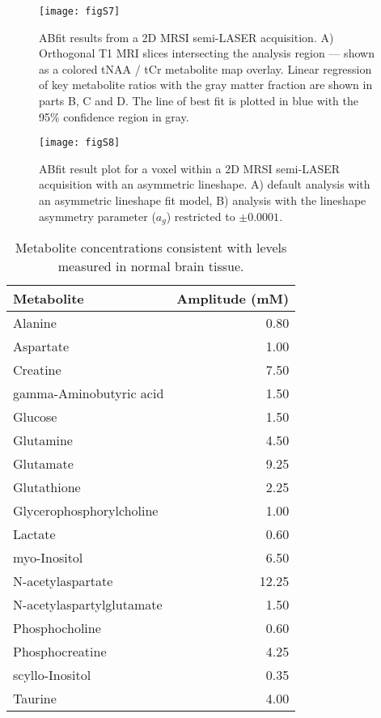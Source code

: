 \documentclass[num-refs]{wiley-article}
\begin{document}
\begin{figure}
  \begin{center}
    \texttt{[image: figS7]}
    \caption{ABfit results from a 2D MRSI semi-LASER acquisition. A) Orthogonal T1 MRI slices intersecting the analysis region --- shown as a colored tNAA / tCr metabolite map overlay. Linear regression of key metabolite ratios with the gray matter fraction are shown in parts B, C and D. The line of best fit is plotted in blue with the 95\% confidence region in gray.}
    \label{mrsi_res}
  \end{center}
\end{figure}

\begin{figure}
  \begin{center}
    \texttt{[image: figS8]}
    \caption{ABfit result plot for a voxel within a 2D MRSI semi-LASER acquisition with an asymmetric lineshape. A) default analysis with an asymmetric lineshape fit model, B) analysis with the lineshape asymmetry parameter ($a_{g}$) restricted to $\pm 0.0001$.}
    \label{lineshape_res}
  \end{center}
\end{figure}

\begin{table}[ht]
\begin{center}
\begin{tabular}{l r}
  \hline
  Metabolite & Amplitude (mM) \\
  \hline
  Alanine & 0.80 \\
  Aspartate & 1.00 \\
  Creatine & 7.50 \\
  gamma-Aminobutyric acid & 1.50 \\
  Glucose & 1.50 \\
  Glutamine & 4.50 \\
  Glutamate & 9.25 \\
  Glutathione & 2.25 \\
  Glycerophosphorylcholine & 1.00 \\
  Lactate & 0.60 \\
  myo-Inositol & 6.50 \\
  N-acetylaspartate & 12.25 \\
  N-acetylaspartylglutamate & 1.50 \\
  Phosphocholine & 0.60 \\
  Phosphocreatine & 4.25 \\
  scyllo-Inositol & 0.35 \\
  Taurine & 4.00 \\
  \hline
\end{tabular}
\end{center}
\caption{Metabolite concentrations consistent with levels measured in normal brain tissue.}
\label{metab_tab}
\end{table}
\end{document}
